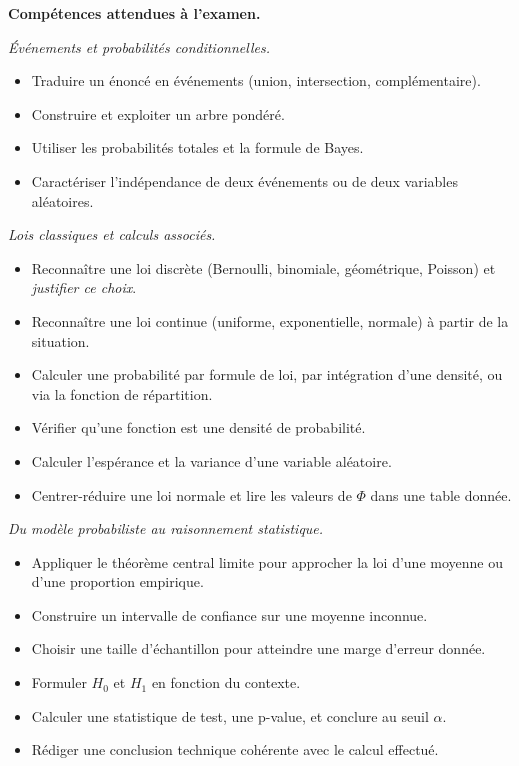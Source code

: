 \begin{mdframed}[backgroundcolor=ThemeLight, linecolor=Theme,
  linewidth=1.5pt, innertopmargin=10pt, innerbottommargin=10pt]
\textbf{Compétences attendues à l'examen.}

\bigskip

\textit{Événements et probabilités conditionnelles.}
\begin{itemize}\setlength{\itemsep}{0.1em}\setlength{\topsep}{0.1em}
  \item Traduire un énoncé en événements (union, intersection, complémentaire).
  \item Construire et exploiter un arbre pondéré.
  \item Utiliser les probabilités totales et la formule de Bayes.
  \item Caractériser l'indépendance de deux événements ou de deux variables aléatoires.
\end{itemize}

\bigskip

\textit{Lois classiques et calculs associés.}
\begin{itemize}\setlength{\itemsep}{0.1em}\setlength{\topsep}{0.1em}
  \item Reconnaître une loi discrète (Bernoulli, binomiale, géométrique, Poisson) et \emph{justifier ce choix}.
  \item Reconnaître une loi continue (uniforme, exponentielle, normale) à partir de la situation.
  \item Calculer une probabilité par formule de loi, par intégration d'une densité, ou via la fonction de répartition.
  \item Vérifier qu'une fonction est une densité de probabilité.
  \item Calculer l'espérance et la variance d'une variable aléatoire.
  \item Centrer-réduire une loi normale et lire les valeurs de $\Phi$ dans une table donnée.
\end{itemize}

\bigskip

\textit{Du modèle probabiliste au raisonnement statistique.}
\begin{itemize}\setlength{\itemsep}{0.1em}\setlength{\topsep}{0.1em}
  \item Appliquer le théorème central limite pour approcher la loi d'une moyenne ou d'une proportion empirique.
  \item Construire un intervalle de confiance sur une moyenne inconnue.
  \item Choisir une taille d'échantillon pour atteindre une marge d'erreur donnée.
  \item Formuler $H_0$ et $H_1$ en fonction du contexte.
  \item Calculer une statistique de test, une p-value, et conclure au seuil $\alpha$.
  \item Rédiger une conclusion technique cohérente avec le calcul effectué.
\end{itemize}
\end{mdframed}
\newpage


